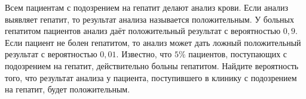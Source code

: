\begin{class}[number=5]
\begin{listofex}
\begin{minipage}[t]{\bodywidth}
			\end{minipage}
		\end{listofex}
		\newpage
		\begin{listofex}[resume]
			\item Всем пациентам с подозрением на гепатит делают анализ крови. Если анализ выявляет гепатит, то результат анализа называется положительным. У больных гепатитом пациентов анализ даёт положительный результат с вероятностью \( 0,9 \). Если пациент не болен гепатитом, то анализ может дать ложный положительный результат с вероятностью \( 0,01 \). Известно, что \( 5\% \) пациентов, поступающих с подозрением на гепатит, действительно больны гепатитом. Найдите вероятность того, что результат анализа у пациента, поступившего в клинику с подозрением на гепатит, будет положительным.	
	\end{listofex}
	\end{class}
	
